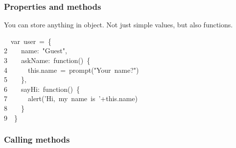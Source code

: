 \documentclass{article}
\begin{document}
\subsubsection{Properties and methods}\label{sec3-properties-and-methods}%

\noindent{}You can store anything in object. Not just simple values, but also functions.%
\begin{mdpre}%
~~{var}~user~=~\{\\
{2}~~~~name:~{"}{Guest}{"},\\
{3}~~~~askName:~{function}()~\{\\
{4}~~~~~~{this}.name~=~prompt({"}{Your~name?}{"})\\
{5}~~~~\},\\
{6}~~~~sayHi:~{function}()~\{\\
{7}~~~~~~alert({'}{Hi,~my~name~is~}{'}+{this}.name)\\
{8}~~~~\}\\
{9}~~\}%
\end{mdpre}\noindent{} 

\subsubsection{Calling methods}\label{sec3-calling-methods}%
\end{document}
